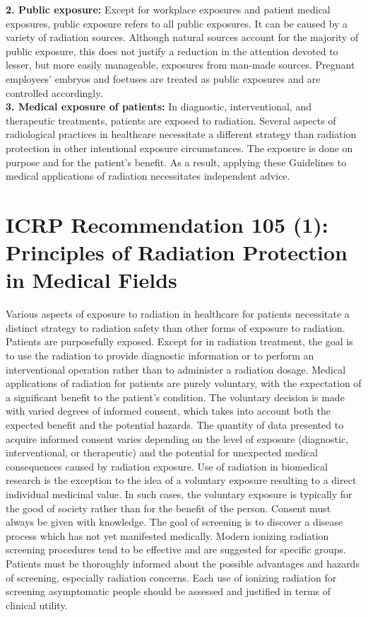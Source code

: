 \documentclass{article}
\begin{document}
\textbf{2.	Public exposure:} Except for workplace exposures and patient medical exposures, public exposure refers to all public exposures. It can be caused by a variety of radiation sources. Although natural sources account for the majority of public exposure, this does not justify a reduction in the attention devoted to lesser, but more easily manageable, exposures from man-made sources. Pregnant employees' embryos and foetuses are treated as public exposures and are controlled accordingly. \\

\textbf{3.	Medical exposure of patients:} In diagnostic, interventional, and therapeutic treatments, patients are exposed to radiation. Several aspects of radiological practices in healthcare necessitate a different strategy than radiation protection in other intentional exposure circumstances. The exposure is done on purpose and for the patient's benefit. As a result, applying these Guidelines to medical applications of radiation necessitates independent advice.

\section{ICRP Recommendation 105 (1): Principles of Radiation 
Protection in Medical Fields}

Various aspects of exposure to radiation in healthcare for patients necessitate a distinct strategy to radiation safety than other forms of exposure to radiation. Patients are purposefully exposed. Except for in radiation treatment, the goal is to use the radiation to provide diagnostic information or to perform an interventional operation rather than to administer a radiation dosage. Medical applications of radiation for patients are purely voluntary, with the expectation of a significant benefit to the patient's condition. The voluntary decision is made with varied degrees of informed consent, which takes into account both the expected benefit and the potential hazards. The quantity of data presented to acquire informed consent varies depending on the level of exposure (diagnostic, interventional, or therapeutic) and the potential for unexpected medical consequences caused by radiation exposure. Use of radiation in biomedical research is the exception to the idea of a voluntary exposure resulting to a direct individual medicinal value. In such cases, the voluntary exposure is typically for the good of society rather than for the benefit of the person. Consent must always be given with knowledge. The goal of screening is to discover a disease process which has not yet manifested medically. Modern ionizing radiation screening procedures tend to be effective and are suggested for specific groups. Patients must be thoroughly informed about the possible advantages and hazards of screening, especially radiation concerns. Each use of ionizing radiation for screening asymptomatic people should be assessed and justified in terms of clinical utility. \\
\end{document}
